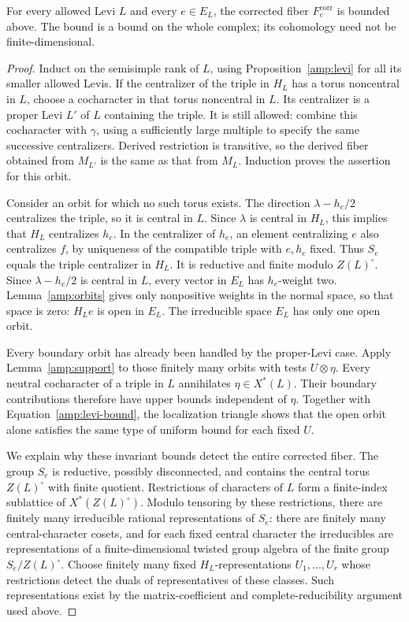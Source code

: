 \begin{proposition}
\label{amp:fiber}
For every allowed Levi $L$ and every $e\in E_L$, the corrected
fiber $F_e^{\mathrm{corr}}$ is bounded above.
The bound is a bound on the whole complex; its cohomology need
not be finite-dimensional.
\end{proposition}

\begin{proof}
Induct on the semisimple rank of $L$, using
Proposition~\ref{amp:levi} for all its smaller allowed Levis.
If the centralizer of the triple in $H_L$ has a torus noncentral
in $L$, choose a cocharacter in that torus noncentral in $L$.
Its centralizer is a proper Levi $L'$ of $L$ containing the triple.
It is still allowed: combine this cocharacter with $\gamma$,
using a sufficiently large multiple to specify the same successive
centralizers.  Derived restriction is transitive, so the derived
fiber obtained from $M_{L'}$ is the same as that from $M_L$.
Induction proves the assertion for this orbit.

Consider an orbit for which no such torus exists.  The direction
$\lambda-h_e/2$ centralizes the triple, so it is central in $L$.
Since $\lambda$ is central in $H_L$, this implies that $H_L$
centralizes $h_e$.  In the centralizer of $h_e$, an element
centralizing $e$ also centralizes $f$, by uniqueness of the
compatible triple with $e,h_e$ fixed.  Thus $S_e$ equals the
triple centralizer in $H_L$. It is reductive and finite modulo
$Z(L)^\circ$. Since $\lambda-h_e/2$ is central in $L$, every vector
in $E_L$ has $h_e$-weight two. Lemma~\ref{amp:orbits} gives only
nonpositive weights in the normal space, so that space is zero:
$H_Le$ is open in $E_L$. The irreducible space $E_L$ has only one
open orbit.

Every boundary orbit has already been handled by the proper-Levi
case.  Apply Lemma~\ref{amp:support} to those finitely many orbits
with tests $U\otimes\eta$.
Every neutral cocharacter of a triple in $L$ annihilates
$\eta\in X^*(L)$.  Their boundary contributions therefore have
upper bounds independent of $\eta$.
Together with Equation~\eqref{amp:levi-bound}, the localization
triangle shows that the open orbit alone satisfies the same type
of uniform bound for each fixed $U$.

We explain why these invariant bounds detect the entire corrected
fiber.  The group $S_e$ is reductive, possibly disconnected, and
contains the central torus $Z(L)^\circ$ with finite quotient.
Restrictions of characters of $L$ form a finite-index sublattice
of $X^*(Z(L)^\circ)$.  Modulo tensoring by these restrictions,
there are finitely many irreducible rational representations of
$S_e$: there are finitely many central-character cosets, and for each
fixed central character the irreducibles are representations of
a finite-dimensional twisted group algebra of the finite group
$S_e/Z(L)^\circ$.  Choose finitely many fixed
$H_L$-representations $U_1,\ldots,U_r$ whose restrictions detect
the duals of representatives of these classes.
Such representations exist by the matrix-coefficient and
complete-reducibility argument used above.


\end{proof}
